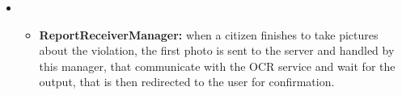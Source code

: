 \begin{itemize}[label={}]
\begin{itemize}
	\end{itemize}
	\item {}
	\begin{itemize}
		\item \textbf{ReportReceiverManager:} when a citizen finishes to take pictures about the violation, the first photo is sent to the server and handled by this manager, that communicate with the OCR service and wait for the output, that is then redirected to the user for confirmation.
	\end{itemize}	
\end{itemize}

